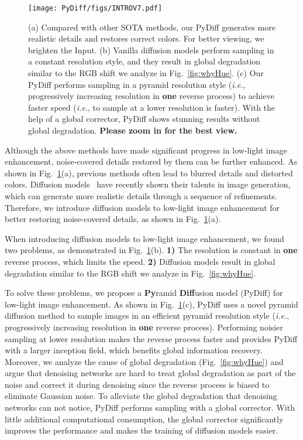 \documentclass{article}
\def\ie{\emph{i.e.}}
\begin{document}
\begin{figure}[tb]
\centering
        \texttt{[image: PyDiff/figs/INTROV7.pdf]}
\caption{(a) Compared with other SOTA methods, our PyDiff generates more realistic details and restores correct colors. For better viewing, we brighten the Input. (b) Vanilla diffusion models perform sampling in a constant resolution style, and they result in global degradation similar to the RGB shift we analyze in Fig.~\ref{fig:whyHue}. (c) Our PyDiff performs sampling in a pyramid resolution style (\ie, progressively increasing resolution in \textbf{one} reverse process) to achieve faster speed (\ie, to sample at a lower resolution is faster). With the help of a global corrector, PyDiff shows stunning results without global degradation. \textbf{Please zoom in for the best view.}
} 


\label{fig:PyDiff_intro}
  \end{figure}


Although the above methods have made significant progress in low-light image enhancement, noise-covered details restored by them can be further enhanced. As shown in Fig.~\ref{fig:PyDiff_intro}(a), previous methods often lead to blurred details and distorted colors. Diffusion models~\cite{ho2020denoising,song2020score} have recently shown their talents in image generation, which can generate more realistic details through a sequence of refinements. Therefore, we introduce diffusion models to low-light image enhancement for better restoring noise-covered details, as shown in Fig.~\ref{fig:PyDiff_intro}(a).



When introducing diffusion models to low-light image enhancement, we found two problems, as demonstrated in Fig.~\ref{fig:PyDiff_intro}(b). \textbf{1)} The resolution is constant in \textbf{one} reverse process, which limits the speed. \textbf{2)} Diffusion models result in global degradation similar to the RGB shift we analyze in Fig.~\ref{fig:whyHue}.

To solve these problems, we propose a \textbf{Py}ramid \textbf{Diff}usion model (PyDiff) for low-light image enhancement. As shown in Fig.~\ref{fig:PyDiff_intro}(c), PyDiff uses a novel pyramid diffusion method to sample images in an efficient pyramid resolution style (\ie, progressively increasing resolution in \textbf{one} reverse process). 
Performing noisier sampling at lower resolution makes the reverse process faster and provides PyDiff with a larger inception field, which benefits global information recovery. Moreover, we analyze the cause of global degradation (Fig.~\ref{fig:whyHue}) and argue that denoising networks are hard to treat global degradation as part of the noise and correct it during denoising since the reverse process is biased to eliminate Gaussian noise.
To alleviate the global degradation that denoising networks can not notice, PyDiff performs sampling with a global corrector. With little additional computational consumption, the global corrector significantly improves the performance and makes the training of diffusion models easier.
\end{document}
